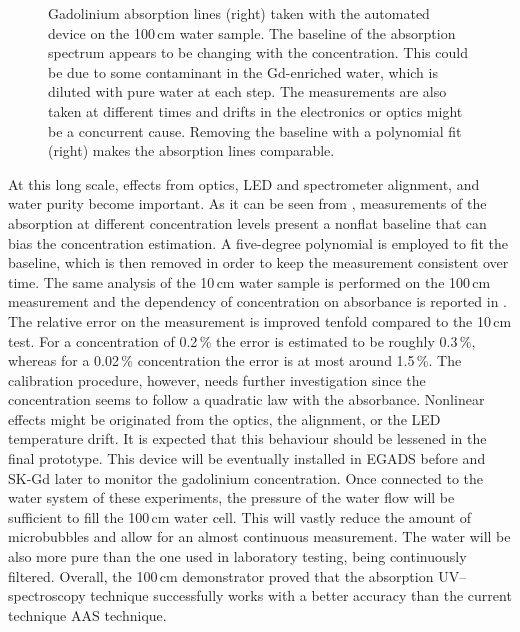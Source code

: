 \begin{figure}
	\centering
	\resizebox{\linewidth}{!}{}
	\caption[Gadolinium absorption spectrum of the 100\,cm water sample]%
		{Gadolinium absorption lines (right) taken with the automated device on the 100\,cm water sample.
		The baseline of the absorption spectrum appears to be changing with the concentration.
		This could be due to some contaminant in the Gd-enriched water, which is diluted with pure water %
		at each step.
		The measurements are also taken at different times and drifts in the electronics or optics might be a %
		concurrent cause.
		Removing the baseline with a polynomial fit (right) makes the absorption lines comparable.}
	\label{fig:gad_fit}
\end{figure}

At this long scale, effects from optics, LED and spectrometer alignment, and water purity become important.
As it can be seen from , measurements of the absorption at different concentration levels %
present a nonflat baseline that can bias the concentration estimation.
A five-degree polynomial is employed to fit the baseline, which is then removed in order to keep the measurement consistent over time.
The same analysis of the 10\,cm water sample is performed on the 100\,cm measurement %
and the dependency of concentration on absorbance is reported in .
The relative error on the measurement is improved tenfold compared to the 10\,cm test.
For a concentration of 0.2\,\% the error is estimated to be roughly 0.3\,\%, %
whereas for a 0.02\,\% concentration the error is at most around 1.5\,\%.
The calibration procedure, however, needs further investigation since %
the concentration seems to follow a quadratic law with the absorbance.
Nonlinear effects might be originated from the optics, the alignment, or the LED temperature drift.
It is expected that this behaviour should be lessened in the final prototype.
This device will be eventually installed in EGADS before and SK-Gd later to monitor the gadolinium concentration.
Once connected to the water system of these experiments, the pressure of the water flow will %
be sufficient to fill the 100\,cm water cell.
This will vastly reduce the amount of microbubbles and allow for an almost continuous measurement.
The water will be also more pure than the one used in laboratory testing, being continuously filtered.
Overall, the 100\,cm demonstrator proved that the absorption UV--spectroscopy technique successfully works %
with a better accuracy than the current technique AAS technique.




